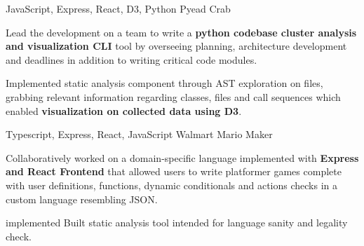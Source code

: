 

\begin{cventries}

    \cventry
    {JavaScript, Express, React, D3, Python} %
    {Pyead Crab \hspace{0.2cm} \hspace{0.2cm}} %
    {} %
    {} %
    {
      \begin{cvitems} %
        \item {Lead the development on a team to write a \textbf{python codebase cluster analysis and visualization CLI} tool by overseeing planning, architecture development and deadlines in addition to writing critical code modules.}
        \item {Implemented static analysis component through AST exploration on files, grabbing relevant information regarding classes, files and call sequences which enabled \textbf{visualization on collected data using D3}.}
      \end{cvitems}
    }
    
    \cventry
    {Typescript, Express, React, JavaScript} %
    {Walmart Mario Maker \hspace{0.2cm} \hspace{0.2cm}} %
    {} %
    {} %
    {
      \begin{cvitems} %
        \item {Collaboratively worked on a domain-specific language implemented with \textbf{Express and React Frontend} that allowed users to write platformer games complete with user definitions, functions, dynamic conditionals and actions checks in a custom language resembling JSON.}
        \item {implemented Built static analysis tool intended for language sanity and legality check.}
      \end{cvitems}
    }


\end{cventries}
